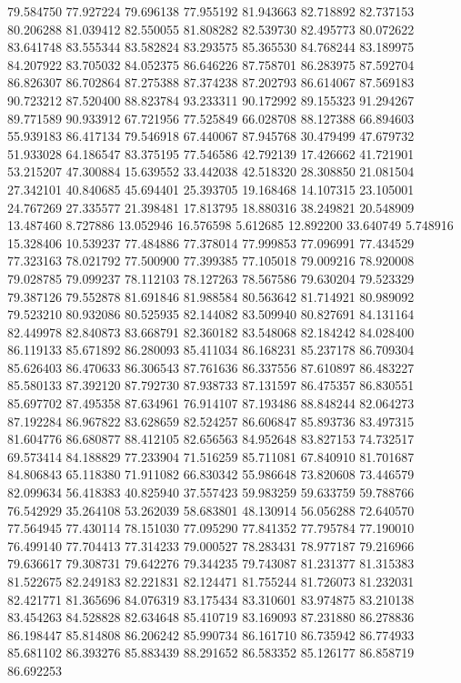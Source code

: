 79.584750
77.927224
79.696138
77.955192
81.943663
82.718892
82.737153
80.206288
81.039412
82.550055
81.808282
82.539730
82.495773
80.072622
83.641748
83.555344
83.582824
83.293575
85.365530
84.768244
83.189975
84.207922
83.705032
84.052375
86.646226
87.758701
86.283975
87.592704
86.826307
86.702864
87.275388
87.374238
87.202793
86.614067
87.569183
90.723212
87.520400
88.823784
93.233311
90.172992
89.155323
91.294267
89.771589
90.933912
67.721956
77.525849
66.028708
88.127388
66.894603
55.939183
86.417134
79.546918
67.440067
87.945768
30.479499
47.679732
51.933028
64.186547
83.375195
77.546586
42.792139
17.426662
41.721901
53.215207
47.300884
15.639552
33.442038
42.518320
28.308850
21.081504
27.342101
40.840685
45.694401
25.393705
19.168468
14.107315
23.105001
24.767269
27.335577
21.398481
17.813795
18.880316
38.249821
20.548909
13.487460
8.727886
13.052946
16.576598
5.612685
12.892200
33.640749
5.748916
15.328406
10.539237
77.484886
77.378014
77.999853
77.096991
77.434529
77.323163
78.021792
77.500900
77.399385
77.105018
79.009216
78.920008
79.028785
79.099237
78.112103
78.127263
78.567586
79.630204
79.523329
79.387126
79.552878
81.691846
81.988584
80.563642
81.714921
80.989092
79.523210
80.932086
80.525935
82.144082
83.509940
80.827691
84.131164
82.449978
82.840873
83.668791
82.360182
83.548068
82.184242
84.028400
86.119133
85.671892
86.280093
85.411034
86.168231
85.237178
86.709304
85.626403
86.470633
86.306543
87.761636
86.337556
87.610897
86.483227
85.580133
87.392120
87.792730
87.938733
87.131597
86.475357
86.830551
85.697702
87.495358
87.634961
76.914107
87.193486
88.848244
82.064273
87.192284
86.967822
83.628659
82.524257
86.606847
85.893736
83.497315
81.604776
86.680877
88.412105
82.656563
84.952648
83.827153
74.732517
69.573414
84.188829
77.233904
71.516259
85.711081
67.840910
81.701687
84.806843
65.118380
71.911082
66.830342
55.986648
73.820608
73.446579
82.099634
56.418383
40.825940
37.557423
59.983259
59.633759
59.788766
76.542929
35.264108
53.262039
58.683801
48.130914
56.056288
72.640570
77.564945
77.430114
78.151030
77.095290
77.841352
77.795784
77.190010
76.499140
77.704413
77.314233
79.000527
78.283431
78.977187
79.216966
79.636617
79.308731
79.642276
79.344235
79.743087
81.231377
81.315383
81.522675
82.249183
82.221831
82.124471
81.755244
81.726073
81.232031
82.421771
81.365696
84.076319
83.175434
83.310601
83.974875
83.210138
83.454263
84.528828
82.634648
85.410719
83.169093
87.231880
86.278836
86.198447
85.814808
86.206242
85.990734
86.161710
86.735942
86.774933
85.681102
86.393276
85.883439
88.291652
86.583352
85.126177
86.858719
86.692253
